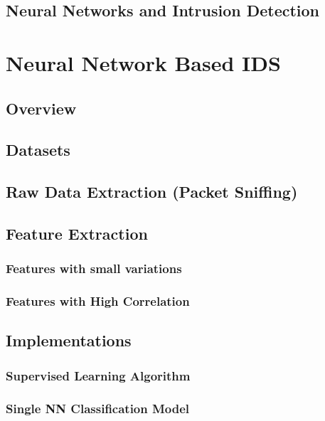\documentclass[12pt]{article}
\begin{document}
		\subsection{Neural Networks and Intrusion Detection}
		\lipsum[1-3]
	
	\cleardoublepage
	\section{Neural Network Based IDS}\label{sec:nn-based-ids}
		\lipsum[2]
		\subsection{Overview}
		\lipsum[2]
		
		\subsection{Datasets}
		
		\subsection{Raw Data Extraction (Packet Sniffing)}
		\lipsum[1-3]
		
		\subsection{Feature Extraction}
		\lipsum[1-6]
			\subsubsection{Features with small variations}
			\lipsum[1-3]
			\subsubsection{Features with High Correlation}
			\lipsum[1-3]
			
		\subsection{Implementations}
		\lipsum[1]
			\subsubsection{Supervised Learning Algorithm}
			\lipsum[1]
			\subsubsection{Single NN Classification Model}
			\lipsum[1]
\end{document}
